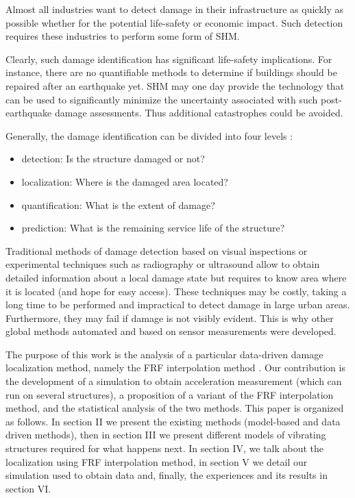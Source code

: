 \documentclass[journal]{IEEEtran}
\begin{document}
Almost all industries want to detect damage in their infrastructure as quickly as possible whether 
 for the potential life-safety or economic impact.
Such detection requires these industries to perform some form of SHM.


Clearly, such damage identification has significant life-safety implications.
For instance, there are  no quantifiable methods to
 determine if buildings should be repaired after an earthquake yet.
SHM may one day provide the technology that can be used to significantly minimize
 the uncertainty associated with such post-earthquake damage assessments.
Thus additional catastrophes could be avoided.


Generally, the damage identification can be divided into four levels \cite{peeters2000system}:
\begin{itemize}
\item detection: Is the structure damaged or not?
\item localization: Where is the damaged area located?
\item quantification: What is the extent of damage?
\item prediction: What is the remaining service life of the structure?
\end{itemize}
\vspace{2mm}

Traditional methods of damage detection based on visual inspections or experimental techniques such as radiography
 or ultrasound allow to obtain detailed information about a local damage state but requires to know area where it is located (and hope for easy access). 
These techniques may be costly, taking a long time to be performed and impractical to detect damage in large urban areas.
 Furthermore, they may fail if damage is not visibly evident. This is why other global methods automated
 and based on sensor measurements were developed.



The purpose of this work is the analysis of a particular data-driven damage localization method,
 namely the FRF interpolation method \cite{dilena2015damage}. Our contribution is the development of a simulation to obtain acceleration measurement (which can run on several structures), a proposition of a variant of the FRF interpolation method, and the statistical analysis of the two methods.
This paper is organized as follows. In section II we  present the existing methods (model-based and data driven methods), 
then in section III we present different models of vibrating structures required for what happens next. In section IV,  we talk about the localization using FRF interpolation method, in section V we detail our simulation used to obtain data and, finally, the experiences and its results in section VI.
\end{document}
